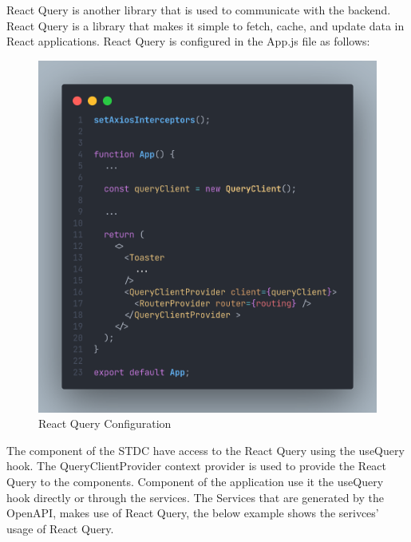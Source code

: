 \begin{justify}
        \vspace{0.25cm}
        \newendline React Query is another library that is used to communicate with the backend. React Query is a library that makes it simple to fetch, cache, and update data in React applications. React Query is configured in the App.js file as follows:

        \begin{figure}[H]
            \centerline{\includegraphics[width=150mm,scale=1]{figures/implementation_and_testing/implementation/frontend/app-query and interceptor.png}}
            \caption{React Query Configuration}
            \label{fig:app-query}
        \end{figure}

        \vspace{0.25cm}
        \newendline The component of the STDC have access to the React Query using the useQuery hook. The QueryClientProvider context provider is used to provide the React Query to the components. Component of the application use it the useQuery hook directly or through the services. The Services that are generated by the OpenAPI, makes use of React Query, the below example shows the serivces' usage of React Query.


\end{justify}
